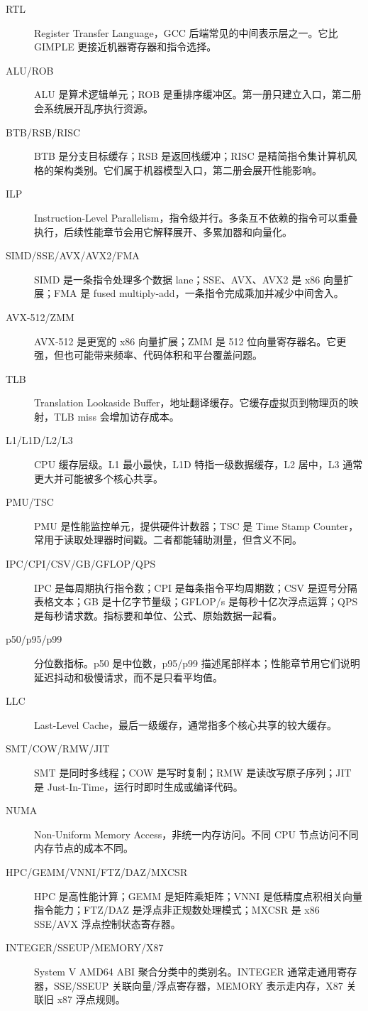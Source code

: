 \begin{description}
  \item[RTL] Register Transfer Language，GCC 后端常见的中间表示层之一。它比 GIMPLE 更接近机器寄存器和指令选择。
  \item[ALU/ROB] ALU 是算术逻辑单元；ROB 是重排序缓冲区。第一册只建立入口，第二册会系统展开乱序执行资源。
  \item[BTB/RSB/RISC] BTB 是分支目标缓存；RSB 是返回栈缓冲；RISC 是精简指令集计算机风格的架构类别。它们属于机器模型入口，第二册会展开性能影响。
  \item[ILP] Instruction-Level Parallelism，指令级并行。多条互不依赖的指令可以重叠执行，后续性能章节会用它解释展开、多累加器和向量化。
  \item[SIMD/SSE/AVX/AVX2/FMA] SIMD 是一条指令处理多个数据 lane；SSE、AVX、AVX2 是 x86 向量扩展；FMA 是 fused multiply-add，一条指令完成乘加并减少中间舍入。
  \item[AVX-512/ZMM] AVX-512 是更宽的 x86 向量扩展；ZMM 是 512 位向量寄存器名。它更强，但也可能带来频率、代码体积和平台覆盖问题。
  \item[TLB] Translation Lookaside Buffer，地址翻译缓存。它缓存虚拟页到物理页的映射，TLB miss 会增加访存成本。
  \item[L1/L1D/L2/L3] CPU 缓存层级。L1 最小最快，L1D 特指一级数据缓存，L2 居中，L3 通常更大并可能被多个核心共享。
  \item[PMU/TSC] PMU 是性能监控单元，提供硬件计数器；TSC 是 Time Stamp Counter，常用于读取处理器时间戳。二者都能辅助测量，但含义不同。
  \item[IPC/CPI/CSV/GB/GFLOP/QPS] IPC 是每周期执行指令数；CPI 是每条指令平均周期数；CSV 是逗号分隔表格文本；GB 是十亿字节量级；GFLOP/s 是每秒十亿次浮点运算；QPS 是每秒请求数。指标要和单位、公式、原始数据一起看。
  \item[p50/p95/p99] 分位数指标。p50 是中位数，p95/p99 描述尾部样本；性能章节用它们说明延迟抖动和极慢请求，而不是只看平均值。
  \item[LLC] Last-Level Cache，最后一级缓存，通常指多个核心共享的较大缓存。
  \item[SMT/COW/RMW/JIT] SMT 是同时多线程；COW 是写时复制；RMW 是读改写原子序列；JIT 是 Just-In-Time，运行时即时生成或编译代码。
  \item[NUMA] Non-Uniform Memory Access，非统一内存访问。不同 CPU 节点访问不同内存节点的成本不同。
  \item[HPC/GEMM/VNNI/FTZ/DAZ/MXCSR] HPC 是高性能计算；GEMM 是矩阵乘矩阵；VNNI 是低精度点积相关向量指令能力；FTZ/DAZ 是浮点非正规数处理模式；MXCSR 是 x86 SSE/AVX 浮点控制状态寄存器。
  \item[INTEGER/SSEUP/MEMORY/X87] System V AMD64 ABI 聚合分类中的类别名。INTEGER 通常走通用寄存器，SSE/SSEUP 关联向量/浮点寄存器，MEMORY 表示走内存，X87 关联旧 x87 浮点规则。

\end{description}
